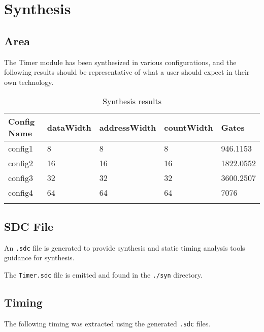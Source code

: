\section{Synthesis}

\subsection{Area}
The Timer module has been synthesized in various configurations, and the following results should be representative of what a user should expect in their own technology.

\renewcommand*{\arraystretch}{1.4}
\begin{longtable}[H]{
    | p{}
    | p{}
    | p{}
    | p{}
    | p{} |
  }
  \hline
  \textbf{Config Name}   &
  \textbf{dataWidth}     &
  \textbf{addressWidth}  &
  \textbf{countWidth}    &
  \textbf{Gates}           \\ \hline \hline

  config1 &
  8 &
  8 &
  8 &
  946.1153 \\ \hline

  config2 &
  16 &
  16 &
  16 &
  1822.0552 \\ \hline

  config3 &
  32 &
  32 &
  32 &
  3600.2507 \\ \hline

  config4 &
  64 &
  64 &
  64 &
  7076 \\ \hline

  \caption{Synthesis results}\label{table:area}
\end{longtable}

\subsection{SDC File}
An \texttt{.sdc} file is generated to provide synthesis and static timing analysis tools guidance for synthesis.

The \texttt{Timer.sdc} file is emitted and found in the \texttt{./syn} directory.

\subsection{Timing}
The following timing was extracted using the generated \texttt{.sdc} files.

